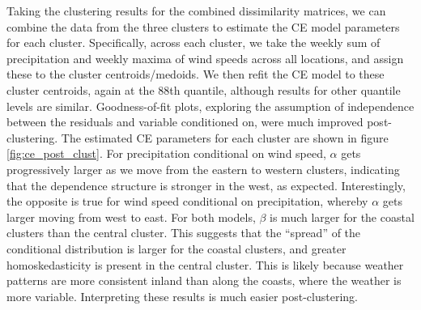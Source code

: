 \documentclass[
  12pt]{article}
\DeclareMathOperator{\CE}{\mathrm{CE}}
\begin{document}
Taking the clustering results for the combined dissimilarity matrices, we can combine the data from the three clusters to estimate the CE model parameters for each cluster.
Specifically, across each cluster, we take the weekly sum of precipitation and weekly maxima of wind speeds across all locations, and assign these to the cluster centroids/medoids.
We then refit the CE model to these cluster centroids, again at the 88th quantile, although results for other quantile levels are similar. 
Goodness-of-fit plots, exploring the assumption of independence between the residuals and variable conditioned on, were much improved post-clustering. 
The estimated CE parameters for each cluster are shown in figure \ref{fig:ce_post_clust}.
For precipitation conditional on wind speed, $\alpha$ gets progressively larger as we move from the eastern to western clusters, indicating that the dependence structure is stronger in the west, as expected.
Interestingly, the opposite is true for wind speed conditional on precipitation, whereby $\alpha$ gets larger moving from west to east. 
For both models, $\beta$ is much larger for the coastal clusters than the central cluster.
This suggests that the ``spread'' of the conditional distribution is larger for the coastal clusters, and greater homoskedasticity is present in the central cluster.
This is likely because weather patterns are more consistent inland than along the coasts, where the weather is more variable.
Interpreting these results is much easier post-clustering. 
\end{document}
